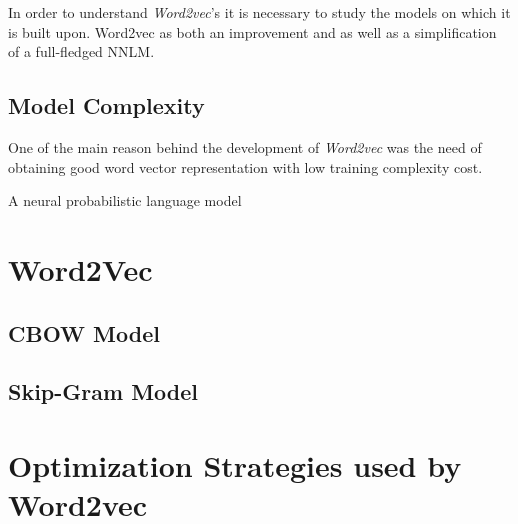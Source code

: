 In order to understand  \textit{Word2vec}'s it is necessary to study the
models on which it is built upon. Word2vec as both an improvement and
as well as a simplification of a full-fledged \ac{NNLM}.

\subsection{Model Complexity}

One of the main reason behind the development of \textit{Word2vec} was the
need of obtaining good word vector representation with low training complexity cost.







A neural probabilistic language model



\section{Word2Vec}





\subsection{\ac{CBOW} Model}
\subsection{Skip-Gram Model}


\section{Optimization Strategies used by Word2vec}
\label{sec:strategies_improve_time}

